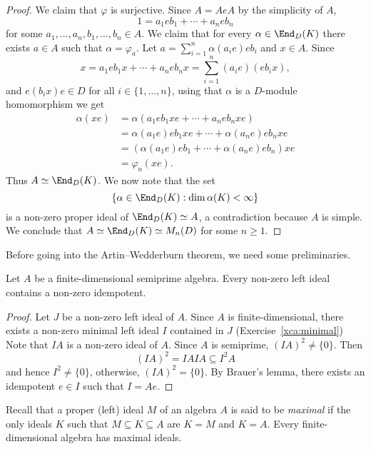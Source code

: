\begin{proof}
    We claim that $\varphi$ is surjective. Since 
    $A=AeA$ by the simplicity of $A$,
    \[
	1=a_1eb_1+\cdots+a_neb_n
	\]
    for some $a_1,\dots,a_n,b_1,\dots,b_n\in A$. 
    We claim that for every $\alpha\in\End_D(K)$
    there exists $a\in A$ such that 
    $\alpha=\varphi_a$.  
	Let $a=\sum_{i=1}^n\alpha(a_ie)eb_i$ and $x\in A$. Since 
    \[
    x=a_1eb_1x+\cdots+a_neb_nx=\sum_{i=1}^n(a_ie)(eb_ix), 
    \]
    and $e(b_ix)e\in D$ for all $i\in\{1,\dots,n\}$, using 
    that $\alpha$ is a $D$-module homomorphism we get 
    \begin{align*}
        \alpha(xe)&=\alpha(a_1eb_1xe+\cdots+a_neb_nxe)\\
        &=\alpha(a_1e)eb_1xe+\cdots+\alpha(a_ne)eb_nxe\\
        &=\left(\alpha(a_1e)eb_1+\cdots+\alpha(a_ne)eb_n\right)xe\\
        &=\varphi_a(xe).
    \end{align*}
    Thus $A\simeq\End_D(K)$. 
    We now note that the set 
    \[
	\{\alpha\in\End_D(K):\dim\alpha(K)<\infty\}
	\]
    is a non-zero proper ideal of $\End_D(K)\simeq A$, a contradiction
    because $A$ is simple. We conclude that 
     $A\simeq\End_D(K)\simeq M_n(D)$ for some $n\geq1$. 
\end{proof}


Before going into the Artin--Wedderburn theorem, 
we need some preliminaries. 

\begin{lemma}
    \label{lem:idempotents}
    Let $A$ be a finite-dimensional semiprime algebra. Every 
    non-zero left ideal contains a non-zero idempotent. 
\end{lemma}

\begin{proof}
Let $J$ be a non-zero left ideal of $A$. 
Since $A$ is finite-dimensional, there exists a non-zero 
minimal left ideal $I$ contained in $J$ (Exercise~\ref{xca:minimal})
Note that $IA$ is a non-zero ideal of $A$. 
Since $A$ 
is semiprime, $(IA)^2\ne\{0\}$. Then 
\[
(IA)^2=IAIA\subseteq I^2A
\]
and hence 
$I^2\ne\{0\}$, otherwise, $(IA)^2=\{0\}$. By Brauer's lemma, there exists an idempotent 
$e\in I$ such that $I=Ae$. 
\end{proof}

Recall that a proper (left) ideal $M$ of an algebra $A$ is said to be \emph{maximal} 
if the only ideals $K$ such that $M\subseteq K\subseteq A$ are $K=M$ and $K=A$. Every
finite-dimensional algebra has maximal ideals. 


